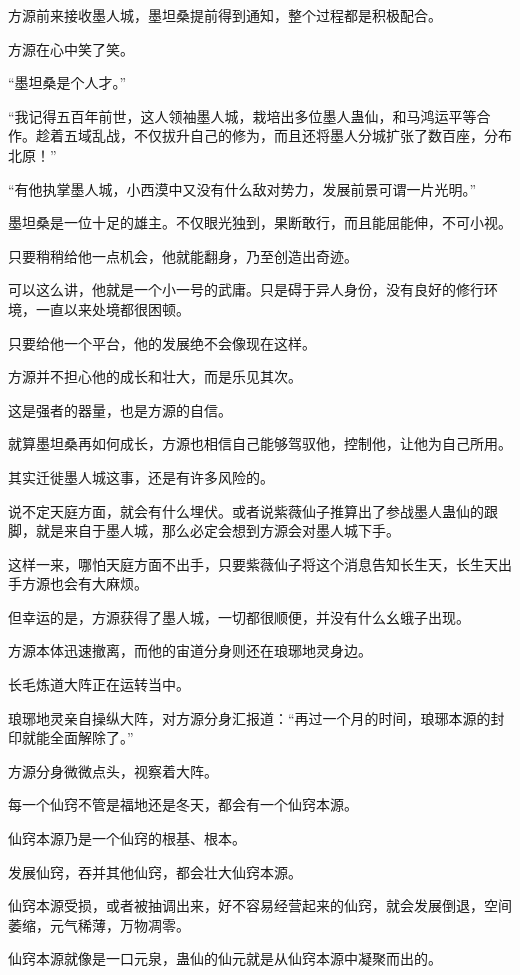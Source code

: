 \begin{this_body}
方源前来接收墨人城，墨坦桑提前得到通知，整个过程都是积极配合。

方源在心中笑了笑。

“墨坦桑是个人才。”

“我记得五百年前世，这人领袖墨人城，栽培出多位墨人蛊仙，和马鸿运平等合作。趁着五域乱战，不仅拔升自己的修为，而且还将墨人分城扩张了数百座，分布北原！”

“有他执掌墨人城，小西漠中又没有什么敌对势力，发展前景可谓一片光明。”

墨坦桑是一位十足的雄主。不仅眼光独到，果断敢行，而且能屈能伸，不可小视。

只要稍稍给他一点机会，他就能翻身，乃至创造出奇迹。

可以这么讲，他就是一个小一号的武庸。只是碍于异人身份，没有良好的修行环境，一直以来处境都很困顿。

只要给他一个平台，他的发展绝不会像现在这样。

方源并不担心他的成长和壮大，而是乐见其次。

这是强者的器量，也是方源的自信。

就算墨坦桑再如何成长，方源也相信自己能够驾驭他，控制他，让他为自己所用。

其实迁徙墨人城这事，还是有许多风险的。

说不定天庭方面，就会有什么埋伏。或者说紫薇仙子推算出了参战墨人蛊仙的跟脚，就是来自于墨人城，那么必定会想到方源会对墨人城下手。

这样一来，哪怕天庭方面不出手，只要紫薇仙子将这个消息告知长生天，长生天出手方源也会有大麻烦。

但幸运的是，方源获得了墨人城，一切都很顺便，并没有什么幺蛾子出现。

方源本体迅速撤离，而他的宙道分身则还在琅琊地灵身边。

长毛炼道大阵正在运转当中。

琅琊地灵亲自操纵大阵，对方源分身汇报道：“再过一个月的时间，琅琊本源的封印就能全面解除了。”

方源分身微微点头，视察着大阵。

每一个仙窍不管是福地还是冬天，都会有一个仙窍本源。

仙窍本源乃是一个仙窍的根基、根本。

发展仙窍，吞并其他仙窍，都会壮大仙窍本源。

仙窍本源受损，或者被抽调出来，好不容易经营起来的仙窍，就会发展倒退，空间萎缩，元气稀薄，万物凋零。

仙窍本源就像是一口元泉，蛊仙的仙元就是从仙窍本源中凝聚而出的。


\end{this_body}
